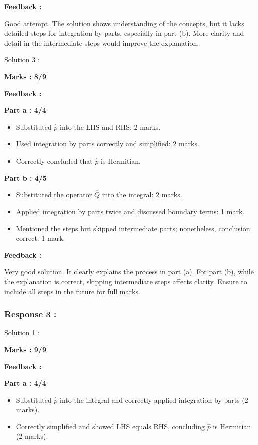 \documentclass[a4paper,11pt]{article}
\begin{document}
\textbf{Feedback :}

Good attempt. The solution shows understanding of the concepts, but it lacks detailed steps for integration by parts, especially in part (b). More clarity and detail in the intermediate steps would improve the explanation.



Solution 3 :

\textbf{Marks : 8/9}

\textbf{Feedback :}

\textbf{Part a : 4/4}

\begin{itemize}
    \item Substituted $\hat{p}$ into the LHS and RHS: 2 marks.
    \item Used integration by parts correctly and simplified: 2 marks.
    \item Correctly concluded that $\hat{p}$ is Hermitian.
\end{itemize}


\textbf{Part b : 4/5}

\begin{itemize}
    \item Substituted the operator $\hat{Q}$ into the integral: 2 marks.
    \item Applied integration by parts twice and discussed boundary terms: 1 mark.
    \item Mentioned the steps but skipped intermediate parts; nonetheless, conclusion correct: 1 mark.
\end{itemize}

\textbf{Feedback :}

Very good solution. It clearly explains the process in part (a). For part (b), while the explanation is correct, skipping intermediate steps affects clarity. Ensure to include all steps in the future for full marks.



\subsubsection*{Response 3 :}

Solution 1 :

\textbf{Marks : 9/9}

\textbf{Feedback :}

\textbf{Part a : 4/4}

\begin{itemize}
    \item Substituted $\hat{p}$ into the integral and correctly applied integration by parts (2 marks).
    \item Correctly simplified and showed LHS equals RHS, concluding $\hat{p}$ is Hermitian (2 marks).
\end{itemize}
\end{document}
